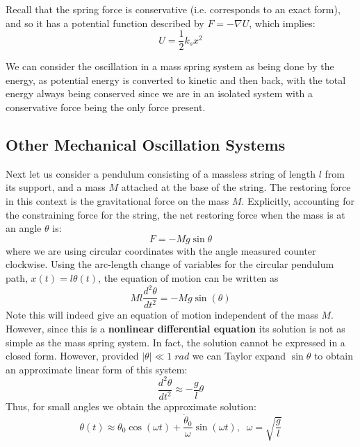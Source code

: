 \documentclass[12pt, a4paper, oneside, openright, titlepage]{book}
\begin{document}
Recall that the spring force is conservative (i.e. corresponds to an exact form), and so it has a potential function described by $F = -\nabla U$, which implies:
\begin{equation}
    U = \frac{1}{2}k_sx^2
\end{equation}


We can consider the oscillation in a mass spring system as being done by the energy, as potential energy is converted to kinetic and then back, with the total energy always being conserved since we are in an isolated system with a conservative force being the only force present.


\subsection{Other Mechanical Oscillation Systems}

Next let us consider a pendulum consisting of a massless string of length $l$ from its support, and a mass $M$ attached at the base of the string. The restoring force in this context is the gravitational force on the mass $M$. Explicitly, accounting for the constraining force for the string, the net restoring force when the mass is at an angle $\theta$ is:
\begin{equation}
    F = -Mg\sin\theta
\end{equation}
where we are using circular coordinates with the angle measured counter clockwise. Using the arc-length change of variables for the circular pendulum path, $x(t) = l\theta(t)$, the equation of motion can be written as 
\begin{equation}
    Ml\frac{d^2\theta}{dt^2} = -Mg\sin(\theta)
\end{equation}
Note this will indeed give an equation of motion independent of the mass $M$. However, since this is a \textbf{nonlinear differential equation} its solution is not as simple as the mass spring system. In fact, the solution cannot be expressed in a closed form. However, provided $|\theta| \ll 1\;rad$ we can Taylor expand $\sin\theta$ to obtain an approximate linear form of this system:
\begin{equation}
    \frac{d^2\theta}{dt^2} \approx -\frac{g}{l}\theta
\end{equation}
Thus, for small angles we obtain the approximate solution:
\begin{equation}
    \theta(t) \approx \theta_0\cos(\omega t)+\frac{\dot{\theta}_0}{\omega}\sin(\omega t),\;\;\omega = \sqrt{\frac{g}{l}}
\end{equation}
\end{document}
